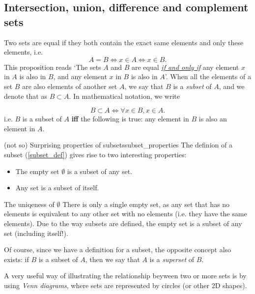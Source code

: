 \subsection{Intersection, union, difference and complement sets}

Two sets are equal if they both contain the exact same elements and only these elements, i.e.
\begin{equation}
	A = B \Longleftrightarrow x\in A \Leftrightarrow x\in B.
	\label{eq:set_equality}
\end{equation}
This proposition reads `The sets $A$ and $B$ are equal \underline{\textit{if and only if}} any element $x$ in $A$ is also in $B$, and any element $x$ in $B$ is also in $A$'. When all the elements of a set $B$ are also elements of another set $A$, we say that $B$ is a \emph{subset} of $A$, and we denote that as $B\subset A$. In mathematical notation, we write

\begin{equation}
	B\subset A \Leftrightarrow \forall x\in B, x\in A.
	\label{eq:subset_def}
\end{equation}
i.e. $B$ is a subset of $A$ \textbf{iff} the following is true: any element in $B$ is also an element in $A$.

\begin{note}{(not so) Surprising properties of subsets}{subset_properties}
	The definion of a subset (\eqref{subset_def}) gives rise to two interesting properties:
	\begin{itemize}
		\item The empty set $\emptyset$ is a subset of any set.
		\item Any set is a subset of itself.
	\end{itemize}
\end{note}

\begin{note}{The uniqeness of $\emptyset$}{}
	There is only a single empty set, as any set that has no elements is equivalent to any other set with no elements (i.e. they have the same elements). Due to the way subsets are defined, the empty set is a subset of any set (including itself!).
\end{note}

Of course, since we have a definition for a subset, the opposite concept also exists: if $B$ is a subset of $A$, then we say that $A$ is a \emph{superset} of $B$.

A very useful way of illustrating the relationship beyween two or more sets is by using \emph{Venn diagrams}, where sets are represented by circles (or other 2D shapes).

